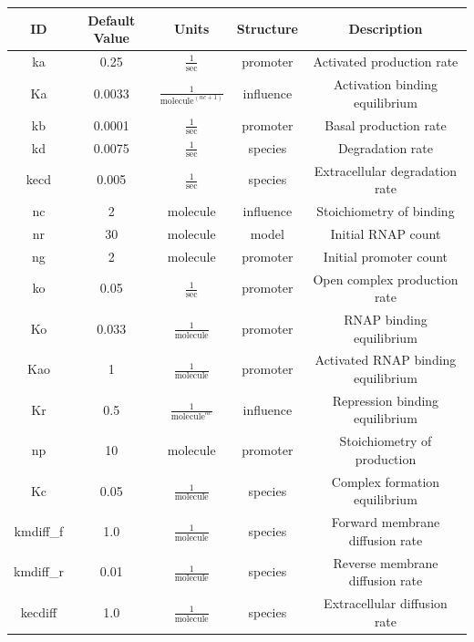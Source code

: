 \documentclass[titlepage,11pt]{article}
\begin{document}
\begin{center}
\begin{tabular}{|c|c|c|c|c|}
\hline
ID & Default Value & Units      & Structure & Description \\ \hline \hline
ka & 0.25          & $\frac{1}{\mathrm{sec}}$ & promoter  
& Activated production rate\\ \hline 
Ka & 0.0033        & $\frac{1}{\mathrm{molecule}^{(nc+1)}}$ & influence
& Activation binding equilibrium \\ \hline
kb & 0.0001        & $\frac{1}{\mathrm{sec}}$ & promoter  
& Basal production rate \\ \hline
kd & 0.0075        & $\frac{1}{\mathrm{sec}}$ & species   
& Degradation rate \\ \hline
kecd & 0.005        & $\frac{1}{\mathrm{sec}}$ & species   
& Extracellular degradation rate \\ \hline
nc & 2             & molecule   & influence  & Stoichiometry of binding \\ \hline
nr & 30            & molecule   & model     & Initial RNAP count \\ \hline
ng & 2             & molecule   & promoter  & Initial promoter count \\ \hline
ko & 0.05          & $\frac{1}{\mathrm{sec}}$ & promoter  
& Open complex production rate \\ \hline
Ko & 0.033         & $\frac{1}{\mathrm{molecule}}$ & promoter  
& RNAP binding equilibrium\\ \hline
Kao & 1         & $\frac{1}{\mathrm{molecule}}$ & promoter  
& Activated RNAP binding equilibrium\\ \hline
Kr & 0.5           & $\frac{1}{\mathrm{molecule}^{nc}}$ & influence
& Repression binding equilibrium \\ \hline
np & 10            & molecule   & promoter  & Stoichiometry of
production \\ \hline
Kc & 0.05          & $\frac{1}{\mathrm{molecule}}$ & species
& Complex formation equilibrium \\ \hline
kmdiff\_f & 1.0          & $\frac{1}{\mathrm{molecule}}$ & species   
& Forward membrane diffusion rate\\ \hline
kmdiff\_r & 0.01          & $\frac{1}{\mathrm{molecule}}$ & species   
& Reverse membrane diffusion rate\\ \hline
kecdiff & 1.0          & $\frac{1}{\mathrm{molecule}}$ & species   
& Extracellular diffusion rate\\ \hline
\end{tabular}
\end{center}
\end{document}
